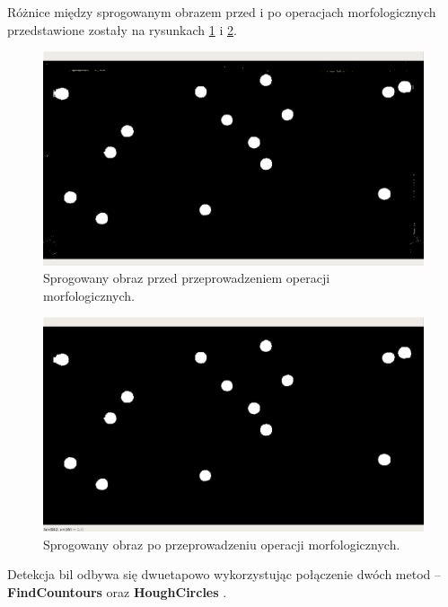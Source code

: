 \documentclass[12pt]{article}
\begin{document}
    Różnice między sprogowanym obrazem przed i po operacjach morfologicznych przedstawione zostały na rysunkach \ref{thresh_before_morph} i \ref{thresh_after_morph}. %

    \begin{figure}[h]
        \centering
        \includegraphics[width=15cm]{./images/obrazki/bp/thresh_before_morph.png}
        \caption{Sprogowany obraz przed przeprowadzeniem operacji morfologicznych.}
        \label{thresh_before_morph}
    \end{figure}

    \begin{figure}[h]
        \centering
        \includegraphics[width=15cm]{./images/obrazki/bp/thresh_contours.png}
        \caption{Sprogowany obraz po przeprowadzeniu operacji morfologicznych.}
        \label{thresh_after_morph}
    \end{figure}
    
    Detekcja bil odbywa się dwuetapowo wykorzystując połączenie dwóch metod – \textbf{FindCountours} \cite{FindContours} oraz \textbf{HoughCircles} \cite{HoughCircles}.
\end{document}
